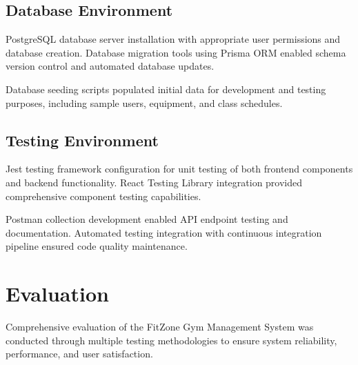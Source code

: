 \documentclass[12pt,a4paper]{report}
\begin{document}
\subsection{Database Environment}

PostgreSQL database server installation with appropriate user permissions and database creation. Database migration tools using Prisma ORM enabled schema version control and automated database updates.

Database seeding scripts populated initial data for development and testing purposes, including sample users, equipment, and class schedules.

\subsection{Testing Environment}

Jest testing framework configuration for unit testing of both frontend components and backend functionality. React Testing Library integration provided comprehensive component testing capabilities.

Postman collection development enabled API endpoint testing and documentation. Automated testing integration with continuous integration pipeline ensured code quality maintenance.


\section{Evaluation}
\label{sec:evaluation}

Comprehensive evaluation of the FitZone Gym Management System was conducted through multiple testing methodologies to ensure system reliability, performance, and user satisfaction.
\end{document}
